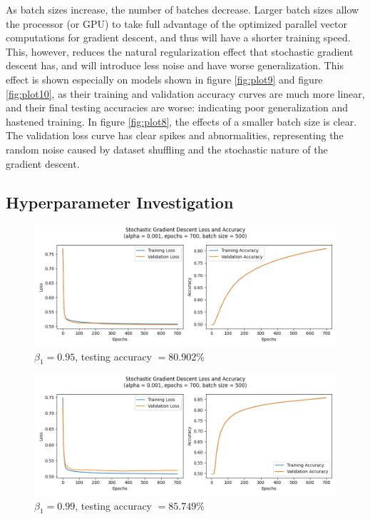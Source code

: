 \documentclass[letter]{article}
\begin{document}
As batch sizes increase, the number of batches decrease. Larger batch sizes allow the processor (or GPU) to take full advantage of the optimized parallel vector computations for gradient descent, and thus will have a shorter training speed. This, however, reduces the natural regularization effect that stochastic gradient descent has, and will introduce less noise and have worse generalization. This effect is shown especially on models shown in figure \ref{fig:plot9} and figure \ref{fig:plot10}, as their training and validation accuracy curves are much more linear, and their final testing accuracies are worse: indicating poor generalization and hastened training. In figure \ref{fig:plot8}, the effects of a smaller batch size is clear. The validation loss curve has clear spikes and abnormalities, representing the random noise caused by dataset shuffling and the stochastic nature of the gradient descent. 

\newpage

\subsection{Hyperparameter Investigation}

\begin{figure}[H]
	\centering
	\includegraphics[width=\linewidth]{Figure_11}
	\caption{$\beta_1 = 0.95$, testing accuracy $ = 80.902\%$}
	\label{fig:plot11}
\end{figure}

\begin{figure}[H]
	\centering
	\includegraphics[width=\linewidth]{Figure_12}
	\caption{$\beta_1 = 0.99$, testing accuracy $ = 85.749\%$}
	\label{fig:plot12}
\end{figure}
\end{document}
